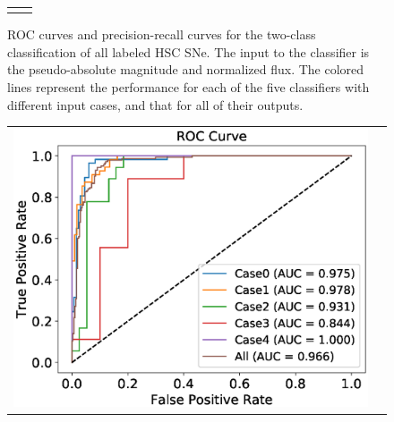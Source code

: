\documentclass[proof]{pasj01}
\begin{document}
\begin{figure}[htbp]
\begin{tabular}{cc}
\begin{minipage}{0.5\hsize}
\begin{center}
            \end{center}
        \end{minipage}
    \end{tabular}
    \vspace{2mm}
    \caption{%
    ROC curves and precision-recall curves for the two-class classification of all labeled HSC SNe.
    The input to the classifier is the pseudo-absolute magnitude and normalized flux.
    The colored lines represent the performance for each of the five classifiers with different input cases, and that for all of their outputs.
    }
    \label{fig:h2_test_all}
\end{figure}
%
%
%
\begin{figure}[htbp]
    \begin{tabular}{cc}
        \begin{minipage}{0.5\hsize}
            \begin{center}
                \includegraphics[width=\columnwidth]{figures/10_absolute-magnitude-scaled-flux-remove-y_SNdata_test_190522_ROC_noedge_spec.eps}
            \end{center}
        \end{minipage}
        \begin{minipage}{0.5\hsize}
            \begin{center}

\end{center}
\end{minipage}
\end{tabular}
\end{figure}
\end{document}
